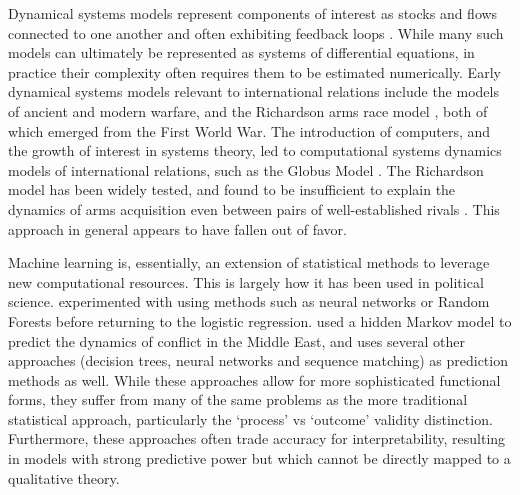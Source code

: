 Dynamical systems models represent components of interest as stocks and flows connected to one another and often exhibiting feedback loops \citep{gilbert_2005}. While many such models can ultimately be represented as systems of differential equations, in practice their complexity often requires them to be estimated numerically. Early dynamical systems models relevant to international relations include the \citet{lanchester_1916} models of ancient and modern warfare, and the Richardson arms race model \citep{rapoport_1957}, both of which emerged from the First World War. The introduction of computers, and the growth of interest in systems theory, led to computational systems dynamics models of international relations, such as the Globus Model \citep{bremer_1987}. The Richardson model has been widely tested, and found to be insufficient to explain the dynamics of arms acquisition even between pairs of well-established rivals \citep{dunne_1999}. This approach in general appears to have fallen out of favor.

Machine learning is, essentially, an extension of statistical methods to leverage new computational resources. This is largely how it has been used in political science. \citet{goldstone_2005} experimented with using methods such as neural networks or Random Forests \citep{breiman_2001} before returning to the logistic regression. \citet{schrodt_1997} used a hidden Markov model to predict the dynamics of conflict in the Middle East, and \citet{schrodt_2004} uses several other approaches (decision trees, neural networks and sequence matching) as prediction methods as well. While these approaches allow for more sophisticated functional forms, they suffer from many of the same problems as the more traditional statistical approach, particularly the `process' vs `outcome' validity distinction. Furthermore, these approaches often trade accuracy for interpretability, resulting in models with strong predictive power but which cannot be directly mapped to a qualitative theory.

